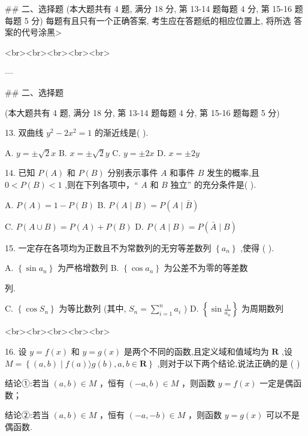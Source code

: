 \documentclass[11pt,a4paper]{article}
\begin{document}
## 二、选择题 (本大题共有 4 题, 满分 18 分, 第 13-14 题每题 4 分, 第 15-16 题 每题 5 分) 每题有且只有一个正确答案, 考生应在答题纸的相应位置上, 将所选 答案的代号涂黑>




<br><br><br><br><br>


---

## 二、选择题

(本大题共有 4 题, 满分 18 分, 第 13-14 题每题 4 分, 第 15-16 题每题 5 分)


13. 双曲线 ${y}^{2} - 2{x}^{2} = 1$ 的渐近线是( ).

A. $y =  \pm  \sqrt{2}x$ B. $x =  \pm  \sqrt{2}y$ C. $y =  \pm  {2x}$ D. $x =  \pm  {2y}$



14. 已知 $P\left( A\right)$ 和 $P\left( B\right)$ 分别表示事件 $A$ 和事件 $B$ 发生的概率,且 $0 < P\left( B\right)  < 1$ ,则在下列各项中，“ $A$ 和 $B$ 独立” 的充分条件是( ).

A. $P\left( A\right)  = 1 - P\left( B\right)$ B. $P\left( {A \mid  B}\right)  = P\left( {A \mid  \bar{B}}\right)$

C. $P\left( {A \cup  B}\right)  = P\left( A\right)  + P\left( B\right)$ D. $P\left( {A \mid  B}\right)  = P\left( {\bar{A} \mid  B}\right)$



15. 一定存在各项均为正数且不为常数列的无穷等差数列 $\left\{  {a}_{n}\right\}$ ,使得 ( ).

A. $\left\{  {\sin {a}_{n}}\right\}$ 为严格增数列 B. $\left\{  {\cos {a}_{n}}\right\}$ 为公差不为零的等差数

列.

C. $\left\{  {\cos {S}_{n}}\right\}$ 为等比数列 (其中, ${S}_{n} = \mathop{\sum }\limits_{{i = 1}}^{n}{a}_{i}$ ) D. $\left\{  {\sin \frac{1}{{a}_{n}}}\right\}$ 为周期数列




<br><br><br><br><br>


16. 设 $y = f\left( x\right)$ 和 $y = g\left( x\right)$ 是两个不同的函数,且定义域和值域均为 $\mathbf{R}$ ,设 $M = \left\{  {\left( {a, b}\right)  \mid  f\left( a\right) \rangle g\left( b\right) , a, b \in  \mathbf{R}}\right\}$ ,则对于以下两个结论,说法正确的是 ( )

结论①:若当 $\left( {a, b}\right)  \in  M$ ，恒有 $\left( {-a, b}\right)  \in  M$ ，则函数 $y = f\left( x\right)$ 一定是偶函数；

结论②:若当 $\left( {a, b}\right)  \in  M$ ，恒有 $\left( {-a, - b}\right)  \in  M$ ，则函数 $y = g\left( x\right)$ 可以不是偶函数.
\end{document}
